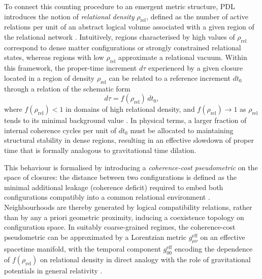 \documentclass[11pt,a4paper]{article}
\theoremstyle{definition}
\begin{document}
To connect this counting procedure to an emergent metric structure, PDL introduces the notion of \emph{relational density} $\rho_{\mathrm{rel}}$, defined as the number of active relations per unit of an abstract logical volume associated with a given region of the relational network \cite{A_Topological_Reformulation_in_the_Projective_Dynamic_Logo_Framework_Hierarchical_Coherence_Filtering_and_the_Exponent_18_in_PDL}. Intuitively, regions characterised by high values of $\rho_{\mathrm{rel}}$ correspond to dense matter configurations or strongly constrained relational states, whereas regions with low $\rho_{\mathrm{rel}}$ approximate a relational vacuum. Within this framework, the proper-time increment $d\tau$ experienced by a given closure located in a region of density $\rho_{\mathrm{rel}}$ can be related to a reference increment $dt_0$ through a relation of the schematic form
\[
d\tau = f(\rho_{\mathrm{rel}})\,dt_0,
\]
where $f(\rho_{\mathrm{rel}}) < 1$ in domains of high relational density, and $f(\rho_{\mathrm{rel}})\to 1$ as $\rho_{\mathrm{rel}}$ tends to its minimal background value \cite{A_Topological_Reformulation_in_the_Projective_Dynamic_Logo_Framework_Hierarchical_Coherence_Filtering_and_the_Exponent_18_in_PDL,PDL_Global_Mapping_Structures_Results_Open_Problems}. In physical terms, a larger fraction of internal coherence cycles per unit of $dt_0$ must be allocated to maintaining structural stability in dense regions, resulting in an effective slowdown of proper time that is formally analogous to gravitational time dilation.

This behaviour is formalised by introducing a \emph{coherence-cost pseudometric} on the space of closures: the distance between two configurations is defined as the minimal additional leakage (coherence deficit) required to embed both configurations compatibly into a common relational environment \cite{A_Topological_Reformulation_in_the_Projective_Dynamic_Logo_Framework_Hierarchical_Coherence_Filtering_and_the_Exponent_18_in_PDL}. Neighbourhoods are thereby generated by logical compatibility relations, rather than by any a priori geometric proximity, inducing a coexistence topology on configuration space. In suitably coarse-grained regimes, the coherence-cost pseudometric can be approximated by a Lorentzian metric $g_{\mu\nu}^{\mathrm{eff}}$ on an effective spacetime manifold, with the temporal component $g_{00}^{\mathrm{eff}}$ encoding the dependence of $f(\rho_{\mathrm{rel}})$ on relational density in direct analogy with the role of gravitational potentials in general relativity \cite{PDL_Global_Mapping_Structures_Results_Open_Problems,A_Topological_Reformulation_in_the_Projective_Dynamic_Logo_Framework_Hierarchical_Coherence_Filtering_and_the_Exponent_18_in_PDL}.
\end{document}
